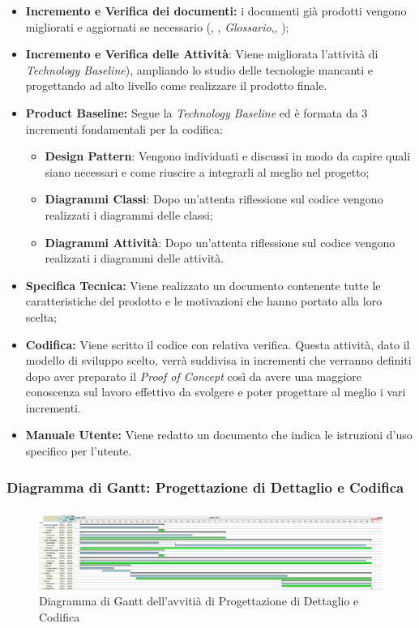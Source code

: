 \begin{itemize}
    \item \textbf{Incremento e Verifica dei documenti:} i documenti già prodotti vengono migliorati e aggiornati se necessario (\textit{\NdP}, \textit{\PdP}, \textit{Glossario},\textit{\PdQ}, \textit{\AdR}); 
    \item \textbf{Incremento e Verifica delle Attività}: Viene migliorata l'attività di \textit{Technology Baseline}), ampliando lo studio delle tecnologie mancanti e progettando ad alto livello come realizzare il prodotto finale.
    \item \textbf{Product Baseline:} Segue la \textit{Technology Baseline} ed è formata da 3 incrementi fondamentali per la codifica:
        \begin{itemize}
            \item \textbf{Design Pattern}: Vengono individuati e discussi in modo da capire quali siano necessari e come riuscire a integrarli al meglio nel progetto;
            \item \textbf{Diagrammi Classi}: Dopo un'attenta riflessione sul codice vengono realizzati i diagrammi delle classi;
            \item \textbf{Diagrammi Attività}: Dopo un'attenta riflessione sul codice vengono realizzati i diagrammi delle attività. 
        \end{itemize} 
    \item \textbf{Specifica Tecnica:} Viene realizzato un documento contenente tutte le caratteristiche del prodotto e le motivazioni che hanno portato alla loro scelta;
    \item \textbf{Codifica:} Viene scritto il codice con relativa verifica. Questa attività, dato il modello di sviluppo scelto, verrà suddivisa in incrementi che verranno definiti dopo aver preparato il \textit{Proof of Concept} così da avere una maggiore conoscenza sul lavoro effettivo da svolgere e poter progettare al meglio i vari incrementi.  
    \item \textbf{Manuale Utente:} Viene redatto un documento che indica le istruzioni d'uso specifico per l'utente.
\end{itemize}

\newpage
\subsubsection{Diagramma di Gantt: Progettazione di Dettaglio e Codifica}
\begin{figure}[ht]
    \centering
    \includegraphics[width=\textwidth]{../../Immagini/GanttProgettazioneDiDettaglioECodifica}
    \caption{Diagramma di Gantt dell'avvitià di Progettazione di Dettaglio e Codifica}
\end{figure}